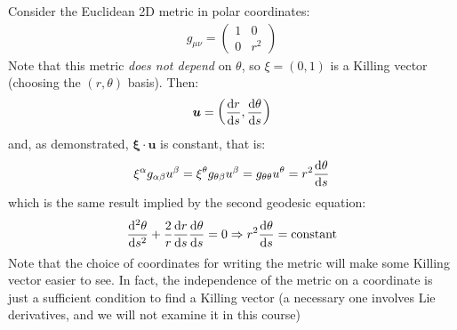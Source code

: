 \documentclass[../template.tex]{subfiles}
\begin{document}
\begin{example}
    Consider the Euclidean 2D metric in polar coordinates:
    \begin{align*}
        g_{\mu \nu} = \left(\begin{array}{cc}
        1 & 0 \\ 
        0 & r^2
        \end{array}\right)
    \end{align*}
    Note that this metric \textit{does not depend} on $\theta$, so $\xi = (0,1)$ is a Killing vector (choosing the $(r,\theta)$ basis). Then:
    \begin{align*}
        \bm{u} = \left(\dv{r}{s}, \dv{\theta}{s}\right)
    \end{align*}    
    and, as demonstrated, $\bm{\xi} \cdot \bm{u}$ is constant, that is:
    \begin{align*}
        \xi^\alpha g_{\alpha \beta} u^\beta = \xi^\theta g_{\theta \beta} u^ \beta = g_{\theta \theta} u^ \theta = r^2 \dv{\theta}{s}
    \end{align*} 
    which is the same result implied by the second geodesic equation:
    \begin{align*}
        \dv[2]{\theta}{s} + \frac{2}{r} \dv{r}{s} \dv{\theta}{s} = 0 \Rightarrow 
        r^2 \dv{\theta}{s} = \text{constant}
    \end{align*}
    Note that the choice of coordinates for writing the metric will make some Killing vector easier to see. In fact, the independence of the metric on a coordinate is just a sufficient condition to find a Killing vector (a necessary one involves Lie derivatives, and we will not examine it in this course)
\end{example}
\end{document}
